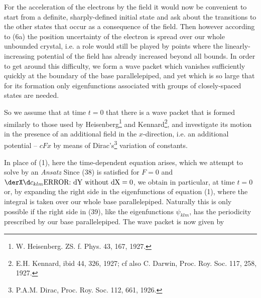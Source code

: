 \begin{paper}{1}
For the acceleration of the electrons by the field it would now be convenient to start from a definite, sharply-defined initial state and ask about the transitions to the other states that occur as a consequence of the field. Then however according to (6a) the position uncertainty of the electron is spread over our whole unbounded crystal, i.e. a role would still be played by points where the linearly-increasing potential of the field has already increased beyond all bounds. In order to get around this difficulty, we form a wave packet which vanishes sufficiently quickly at the boundary of the base parallelepiped, and yet which is so large that for its formation only eigenfunctions associated with groups of closely-spaced states are needed.

So we assume that at time $t=0$ that there is a wave packet that is formed similarly to those used by Heisenberg\footnote{W. Heisenberg. ZS. f. Phys. 43, 167, 1927.} and Kennard\footnote{E.H. Kennard, ibid 44, 326, 1927; cf also C. Darwin, Proc. Roy. Soc. 117, 258, 1927.}, and investigate its motion in the presence of an additional field in the $x$-direction, i.e. an additional potential -- $cFx$ by means of Dirac's\footnote{P.A.M. Dirac, Proc. Roy. Soc. 112, 661, 1926.} variation of constants.

In place of (1), here the time-dependent equation
arises, which we attempt to solve by an \textit{Ansatz}
Since (38) is satisfied for $F=0$ and $\dX{c_{klm}}\dY{t}=0$, we obtain
in particular, at time $t=0$
or, by expanding the right side in the eigenfunctions of equation (1),
where the integral is taken over our whole base parallelepiped. Naturally this is only possible if the right side in (39), like the eigenfunctions $\psi_{klm}$, has the periodicity prescribed by our base parallelepiped. The wave packet is now given by


\end{paper}
